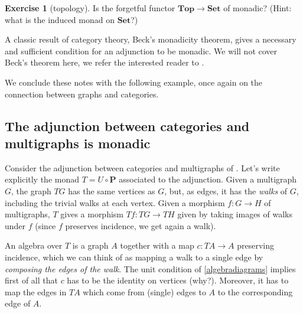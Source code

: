 \documentclass[12pt,oneside]{scrbook}
\numberwithin{equation}{section}
\theoremstyle{plain}
\theoremstyle{definition}
\newtheorem{ex}[thm]{Exercise}
\newcommand{\cat}[1]{{\mathbf{#1}}} %
\DeclareMathOperator{\1}{\mathbbm{1}}
\DeclareMathOperator{\2}{\mathbbm{2}}
\begin{document}
\begin{ex}[topology]
 Is the forgetful functor $\cat{Top}\to\cat{Set}$ of  monadic? (Hint: what is the induced monad on $\cat{Set}$?)
\end{ex}



A classic result of category theory, Beck's monadicity theorem, gives a necessary and sufficient condition for an adjunction to be monadic. We will not cover Beck's theorem here, we refer the interested reader to \cite[Chapter~5]{ctcontext}. 

We conclude these notes with the following example, once again on the connection between graphs and categories.

\subsection{The adjunction between categories and multigraphs is monadic}\label{catgraphmonadic}

Consider the adjunction between categories and multigraphs of .
 Let's write explicitly the monad $T=U\circ\cat{P}$ associated to the adjunction. 
 Given a multigraph $G$, the graph $TG$ has the same vertices as $G$, but, as edges, it has the \emph{walks} of $G$, including the trivial walks at each vertex. Given a morphism $f:G\to H$ of multigraphs, $T$ gives a morphism $Tf:TG\to TH$ given by taking images of walks under $f$ (since $f$ preserves incidence, we get again a walk). 
 
 An algebra over $T$ is a graph $A$ together with a map $c:TA\to A$ preserving incidence, which we can think of as mapping a walk to a single edge by \emph{composing the edges of the walk}. The unit condition of \eqref{algebradiagrams} implies first of all that $c$ has to be the identity on vertices (why?). Moreover, it has to map the edges in $TA$ which come from (single) edges to $A$ to the corresponding edge of $A$.
 
\end{document}
